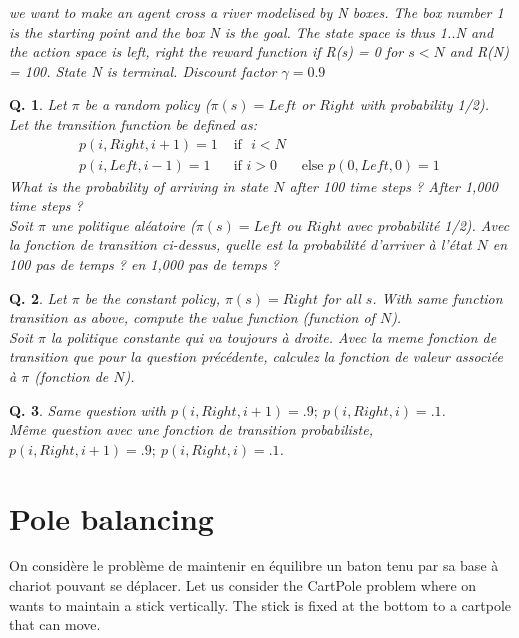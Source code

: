 \documentclass[a4paper]{exam}
\newtheorem{question}{{\bf Q.}}[section]
\begin{document}
\em{we want to make an agent cross a river modelised by N boxes. The box number 1 is the starting point and the box N is the goal. The state space is thus {1..N} and the action space is {left, right} the reward function if R(s) = 0 for $s < N$ and R(N) = 100. State N is terminal. Discount factor $\gamma = 0.9 $}

\centerline{}

\begin{question}
	Let $\pi$ be a random policy ($\pi(s) = Left$ or $Right$ with probability 1/2). Let the transition function be defined as:
	\[ \begin{array}{lll}
	p(i,Right,i+1) = 1 & \mbox{~if~ } i < N \\
	p(i,Left,i-1) = 1 & \mbox{~if } i > 0 & \mbox{~else~} p(0,Left,0) = 1 \
	\end{array} \]
	What is the probability of arriving in state $N$ after 100 time steps ? After 1,000 time steps ?\\
	{\em Soit $\pi$ une politique al\'eatoire ($\pi(s) = Left$ ou $Right$ avec probabilit\'e 1/2). Avec la fonction de transition ci-dessus, quelle est la probabilité d'arriver à l'état $N$ en 100 pas de temps ? en 1,000 pas de temps ?}

\end{question}

\begin{question}
	Let $\pi$ be the constant policy, $\pi(s) = Right$ for all $s$. With same function transition as above, compute the value function (function of $N$).\\
	{\em Soit $\pi$ la politique constante qui va toujours à droite. Avec la meme fonction de transition que pour la question précédente, calculez la fonction de valeur associée à $\pi$ (fonction de $N$).}
\end{question}

\begin{question}
	Same question with $p(i,Right,i+1) = .9; ~p(i,Right,i) = .1$.\\
	{\em Même question avec une fonction de transition probabiliste, $p(i,Right,i+1) = .9; ~p(i,Right,i) = .1$.}
\end{question}

\section{Pole balancing}

On considère le problème de maintenir en équilibre un baton tenu par sa base à chariot pouvant se déplacer. Let us consider the CartPole problem where on wants to maintain a stick vertically. The stick is fixed at the bottom to a cartpole that can move.
\end{document}
